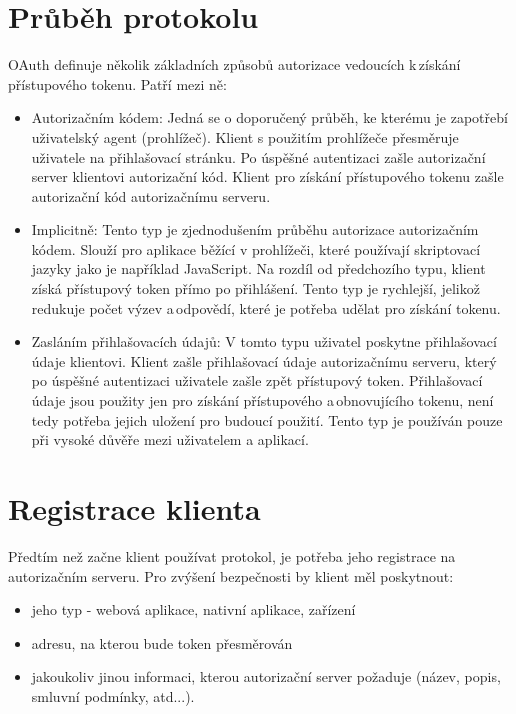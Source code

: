 \documentclass[]{fithesis3}
\begin{document}
	\section{Průběh protokolu}

	OAuth definuje několik základních způsobů autorizace vedoucích k\,získání přístupového 			tokenu. Patří mezi ně:

		\begin{itemize}
 		\item Autorizačním kódem:
  		\newline
		Jedná se o doporučený průběh, ke kterému je zapotřebí uživatelský agent 						(prohlížeč). Klient s použitím prohlížeče přesměruje uživatele na přihlašovací stránku. Po 			úspěšné autentizaci zašle autorizační server klientovi autorizační kód. Klient pro získání 			přístupového tokenu zašle autorizační kód autorizačnímu serveru.
  		\item Implicitně:
  		\newline
		Tento typ je zjednodušením průběhu autorizace autorizačním kódem. Slouží pro aplikace 			běžící v prohlížeči, které používají skriptovací jazyky jako je například JavaScript. Na rozdíl 		od předchozího typu, klient získá přístupový token přímo po přihlášení. Tento typ je 				rychlejší,	jelikož redukuje počet výzev a\,odpovědí, které je potřeba udělat pro získání 				tokenu.
 	 	\item Zasláním přihlašovacích údajů:
  		\newline
		V tomto typu uživatel poskytne přihlašovací údaje klientovi. Klient zašle přihlašovací údaje 		autorizačnímu serveru, který po úspěšné autentizaci uživatele zašle zpět přístupový 				token. Přihlašovací údaje jsou použity jen pro získání přístupového a\,obnovujícího tokenu, 			není tedy potřeba jejich uložení pro budoucí použití. Tento typ je používán pouze při 				vysoké důvěře mezi uživatelem a aplikací. 
		\end{itemize}
		
	\newpage

	\section{Registrace klienta}

	Předtím než začne klient používat protokol, je potřeba jeho registrace na autorizačním serveru. 	Pro zvýšení bezpečnosti by klient měl poskytnout:

	\begin{itemize}
  		\item jeho typ - webová aplikace, nativní aplikace, zařízení
		\item adresu, na kterou bude token přesměrován
		\item jakoukoliv jinou informaci, kterou autorizační server požaduje (název, popis, smluvní 				podmínky, atd...).
	\end{itemize}
\end{document}
